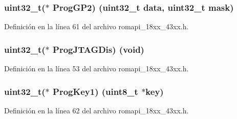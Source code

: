 \subsubsection[{\texorpdfstring{Prog\+G\+P2}{ProgGP2}}]{\setlength{\rightskip}{0pt plus 5cm}uint32\+\_\+t($\ast$ Prog\+G\+P2) (uint32\+\_\+t data, uint32\+\_\+t mask)}\hypertarget{struct_o_t_p___a_p_i___t_a179192e9a2a7d6ce0ec78c84cac7aaff}{}\label{struct_o_t_p___a_p_i___t_a179192e9a2a7d6ce0ec78c84cac7aaff}


Definición en la línea 61 del archivo romapi\+\_\+18xx\+\_\+43xx.\+h.

\subsubsection[{\texorpdfstring{Prog\+J\+T\+A\+G\+Dis}{ProgJTAGDis}}]{\setlength{\rightskip}{0pt plus 5cm}uint32\+\_\+t($\ast$ Prog\+J\+T\+A\+G\+Dis) (void)}\hypertarget{struct_o_t_p___a_p_i___t_a7e808cb567f2abb5b1323eaebcfa8285}{}\label{struct_o_t_p___a_p_i___t_a7e808cb567f2abb5b1323eaebcfa8285}


Definición en la línea 53 del archivo romapi\+\_\+18xx\+\_\+43xx.\+h.

\subsubsection[{\texorpdfstring{Prog\+Key1}{ProgKey1}}]{\setlength{\rightskip}{0pt plus 5cm}uint32\+\_\+t($\ast$ Prog\+Key1) (uint8\+\_\+t $\ast$key)}\hypertarget{struct_o_t_p___a_p_i___t_a138d93e6b42e6ab0e39362c7e38f5df4}{}\label{struct_o_t_p___a_p_i___t_a138d93e6b42e6ab0e39362c7e38f5df4}


Definición en la línea 62 del archivo romapi\+\_\+18xx\+\_\+43xx.\+h.

